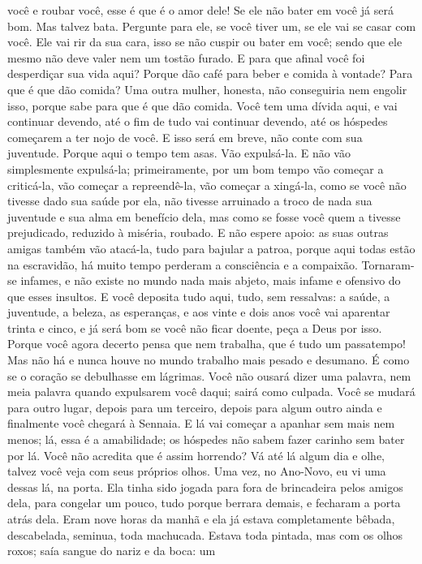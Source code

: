 você e roubar você, esse é que é o amor dele! Se ele não bater em você
já será bom. Mas talvez bata. Pergunte para ele, se você tiver um, se
ele vai se casar com você. Ele vai rir da sua cara, isso se não cuspir
ou bater em você; sendo que ele mesmo não deve valer nem um tostão
furado. E para que afinal você foi desperdiçar sua vida aqui? Porque
dão café para beber e comida à vontade? Para que é que dão comida? Uma
outra mulher, honesta, não conseguiria nem engolir isso, porque sabe
para que é que dão comida. Você tem uma dívida aqui, e vai continuar
devendo, até o fim de tudo vai continuar devendo, até os hóspedes
começarem a ter nojo de você. E isso será em breve, não conte com sua
juventude. Porque aqui o tempo tem asas. Vão expulsá-la. E não vão
simplesmente expulsá-la; primeiramente, por um bom tempo vão começar a
criticá-la, vão começar a repreendê-la, vão começar a xingá-la, como se
você não tivesse dado sua saúde por ela, não tivesse arruinado a troco
de nada sua juventude e sua alma em benefício dela, mas como se fosse
você quem a tivesse prejudicado, reduzido à miséria, roubado. E não
espere apoio: as suas outras amigas também vão atacá-la, tudo para
bajular a patroa, porque aqui todas estão na escravidão, há muito tempo
perderam a consciência e a compaixão. Tornaram-se infames, e não existe
no mundo nada mais abjeto, mais infame e ofensivo do que esses
insultos. E você deposita tudo aqui, tudo, sem ressalvas: a saúde, a
juventude, a beleza, as esperanças, e aos vinte e dois anos você vai
aparentar trinta e cinco, e já será bom se você não ficar doente, peça
a Deus por isso. Porque você agora decerto pensa que nem trabalha, que
é tudo um passatempo! Mas não há e nunca houve no mundo trabalho mais
pesado e desumano. É como se o coração se debulhasse em lágrimas. Você
não ousará dizer uma palavra, nem meia palavra quando expulsarem você
daqui; sairá como culpada. Você se mudará para outro lugar, depois para
um terceiro, depois para algum outro ainda e finalmente você chegará à
Sennaia. E lá vai começar a apanhar sem mais nem menos; lá, essa é a
amabilidade; os hóspedes não sabem fazer carinho sem bater por lá. Você
não acredita que é assim horrendo? Vá até lá algum dia e olhe, talvez
você veja com seus próprios olhos. Uma vez, no Ano-Novo, eu vi uma
dessas lá, na porta. Ela tinha sido jogada para fora de brincadeira
pelos amigos dela, para congelar um pouco, tudo porque berrara demais,
e fecharam a porta atrás dela. Eram nove horas da manhã e ela já estava
completamente bêbada, descabelada, seminua, toda machucada. Estava toda
pintada, mas com os olhos roxos; saía sangue do nariz e da boca: um
